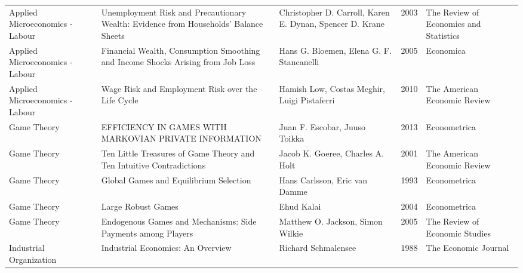 \begin{xltabular}[p]{\hsize}{sYsrs}
Applied Microeconomics - Labour &                                            Unemployment Risk and Precautionary Wealth: Evidence from Households' Balance Sheets &      Christopher D. Carroll, Karen E. Dynan, Spencer D. Krane & 2003 & The Review of Economics and Statistics \\
Applied Microeconomics - Labour &                                                 Financial Wealth, Consumption Smoothing and Income Shocks Arising from Job Loss &                      Hans G. Bloemen, Elena G. F. Stancanelli & 2005 &                              Economica \\
Applied Microeconomics - Labour &                                                                               Wage Risk and Employment Risk over the Life Cycle &                   Hamish Low, Costas Meghir, Luigi Pistaferri & 2010 &           The American Economic Review \\
                    Game Theory &                                                                          EFFICIENCY IN GAMES WITH MARKOVIAN PRIVATE INFORMATION &                                 Juan F. Escobar, Juuso Toikka & 2013 &                           Econometrica \\
                    Game Theory &                                                            Ten Little Treasures of Game Theory and Ten Intuitive Contradictions &                              Jacob K. Goeree, Charles A. Holt & 2001 &           The American Economic Review \\
                    Game Theory &                                                                                          Global Games and Equilibrium Selection &                                 Hans Carlsson, Eric van Damme & 1993 &                           Econometrica \\
                    Game Theory &                                                                                                              Large Robust Games &                                                    Ehud Kalai & 2004 &                           Econometrica \\
                    Game Theory &                                                                    Endogenous Games and Mechanisms: Side Payments among Players &                              Matthew O. Jackson, Simon Wilkie & 2005 &         The Review of Economic Studies \\
        Industrial Organization &                                                                                               Industrial Economics: An Overview &                                           Richard Schmalensee & 1988 &                   The Economic Journal \\

\end{xltabular}
